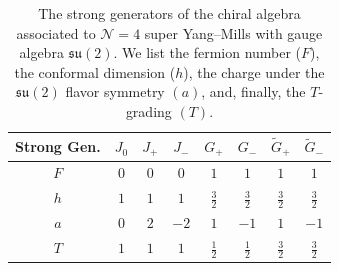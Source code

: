 \documentclass[12pt]{article}
\numberwithin{equation}{section}
\numberwithin{figure}{section}
\theoremstyle{plain}
\theoremstyle{definition}
\begin{document}
\begin{table}[H]
    \centering
    \begin{threeparttable}
    \begin{tabular}{cccccccc}
        \toprule
        Strong Gen. & $J_0$ & $J_+$ & $J_-$ & $G_+$ & $G_-$ & $\widetilde{G}_+$ & $\widetilde{G}_-$ \\\midrule
        $F$ & $0$ & $0$ & $0$ & $1$ & $1$ & $1$ & $1$ \\[1pt]
        $h$ & $1$ & $1$ & $1$ & $\frac{3}{2}$ & $\frac{3}{2}$ & $\frac{3}{2}$ & $\frac{3}{2}$ \\[3pt]
        $a$ & $0$ & $2$ & $-2$ & $1$ & $-1$ & $1$ & $-1$ \\[3pt]
        $T$ & $1$ & $1$ & $1$ & $\frac{1}{2}$ & $\frac{1}{2}$ & $\frac{3}{2}$ & $\frac{3}{2}$ \\\bottomrule
    \end{tabular}
    \end{threeparttable}
    \caption{The strong generators of the chiral algebra associated to $\mathcal{N}=4$ super Yang--Mills with gauge algebra $\mathfrak{su}(2)$. We list the fermion number ($F$), the conformal dimension ($h$), the charge under the $\mathfrak{su}(2)$ flavor symmetry $(a)$, and, finally, the $T$-grading $(T)$.}
    \label{tbl:N4SG}
\end{table}
\end{document}
